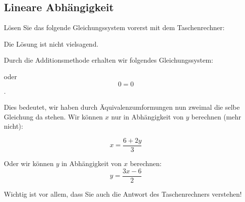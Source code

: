 \subsection{Lineare Abhängigkeit}

Lösen Sie das folgende Gleichungssystem vorerst mit dem
Taschenrechner:


Die Lösung ist nicht vielsagend.

Durch die Additionsmethode erhalten wir folgendes Gleichungssystem:

oder $$0=0$$.

Dies bedeutet, wir haben durch Äquivalenzumformungen nun zweimal die selbe
Gleichung da stehen. Wir können $x$ nur in Abhängigkeit von $y$
berechnen (mehr nicht):

$$x=\frac{6+2y}{3}$$

Oder wir können $y$ in Abhängigkeit von $x$ berechnen:
$$y=\frac{3x-6}{2}$$

Wichtig ist vor allem, dass Sie auch die Antwort des Taschenrechners verstehen!
